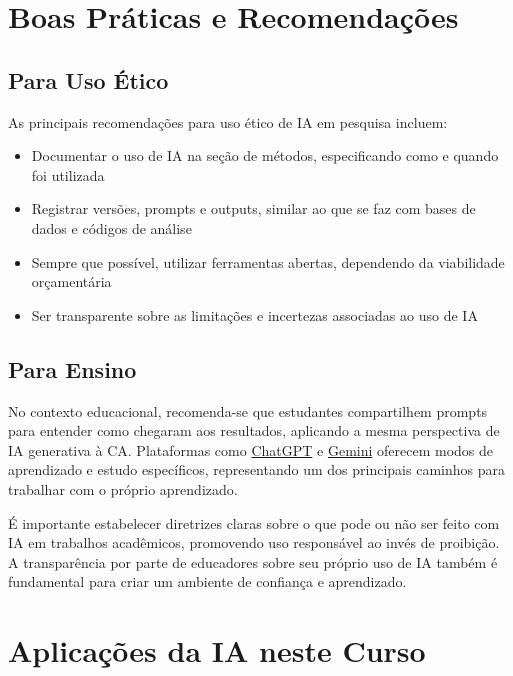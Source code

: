 \documentclass[
  a4paper,
]{book}
\providecommand{\tightlist}{%
  \setlength{\itemsep}{0pt}\setlength{\parskip}{0pt}}\usepackage{longtable,booktabs,array}
\begin{document}
\section{Boas Práticas e
Recomendações}\label{boas-pruxe1ticas-e-recomendauxe7uxf5es}

\subsection{Para Uso Ético}\label{para-uso-uxe9tico}

As principais recomendações para uso ético de IA em pesquisa incluem:

\begin{itemize}
\tightlist
\item
  Documentar o uso de IA na seção de métodos, especificando como e
  quando foi utilizada
\item
  Registrar versões, prompts e outputs, similar ao que se faz com bases
  de dados e códigos de análise
\item
  Sempre que possível, utilizar ferramentas abertas, dependendo da
  viabilidade orçamentária
\item
  Ser transparente sobre as limitações e incertezas associadas ao uso de
  IA
\end{itemize}

\subsection{Para Ensino}\label{para-ensino}

No contexto educacional, recomenda-se que estudantes compartilhem
prompts para entender como chegaram aos resultados, aplicando a mesma
perspectiva de IA generativa à CA. Plataformas como
\href{https://chatgpt.com/}{ChatGPT} e
\href{https://gemini.google.com/}{Gemini} oferecem modos de aprendizado
e estudo específicos, representando um dos principais caminhos para
trabalhar com o próprio aprendizado.

É importante estabelecer diretrizes claras sobre o que pode ou não ser
feito com IA em trabalhos acadêmicos, promovendo uso responsável ao
invés de proibição. A transparência por parte de educadores sobre seu
próprio uso de IA também é fundamental para criar um ambiente de
confiança e aprendizado.

\section{Aplicações da IA neste
Curso}\label{aplicauxe7uxf5es-da-ia-neste-curso}
\end{document}
